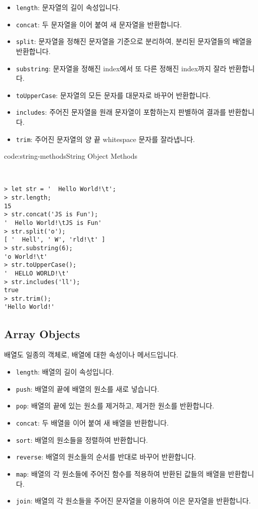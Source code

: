\begin{itemize}
    \item \verb|length|: 문자열의 길이 속성입니다. 
    \item \verb|concat|: 두 문자열을 이어 붙여 새 문자열을 반환합니다. 
    \item \verb|split|: 문자열을 정해진 문자열을 기준으로 분리하여, 분리된 문자열들의 배열을 반환합니다. 
    \item \verb|substring|: 문자열을 정해진 index에서 또 다른 정해진 index까지 잘라 반환합니다.
    \item \verb|toUpperCase|: 문자열의 모든 문자를 대문자로 바꾸어 반환합니다. 
    \item \verb|includes|: 주어진 문자열을 원래 문자열이 포함하는지 판별하여 결과를 반환합니다. 
    \item \verb|trim|: 주어진 문자열의 양 끝 whitespace 문자를 잘라냅니다. 
\end{itemize}

\begin{codeenv}{code:string-methods}{String Object Methods}\begin{verbatim}


> let str = '  Hello World!\t';
> str.length;
15
> str.concat('JS is Fun');
'  Hello World!\tJS is Fun'
> str.split('o');
[ '  Hell', ' W', 'rld!\t' ]
> str.substring(6);
'o World!\t'
> str.toUpperCase();
'  HELLO WORLD!\t'
> str.includes('ll');
true
> str.trim();
'Hello World!'
\end{verbatim}
\end{codeenv}

\subsection*{Array Objects}

배열도 일종의 객체로, 배열에 대한 속성이나 메서드입니다. 

\begin{itemize}
    \item \verb|length|: 배열의 길이 속성입니다. 
    \item \verb|push|: 배열의 끝에 배열의 원소를 새로 넣습니다. 
    \item \verb|pop|: 배열의 끝에 있는 원소를 제거하고, 제거한 원소를 반환합니다. 
    \item \verb|concat|: 두 배열을 이어 붙여 새 배열을 반환합니다. 
    \item \verb|sort|: 배열의 원소들을 정렬하여 반환합니다. 
    \item \verb|reverse|: 배열의 원소들의 순서를 반대로 바꾸어 반환합니다. 
    \item \verb|map|: 배열의 각 원소들에 주어진 함수를 적용하여 반환된 값들의 배열을 반환합니다. 
    \item \verb|join|: 배열의 각 원소들을 주어진 문자열을 이용하여 이은 문자열을 반환합니다. 
\end{itemize}

